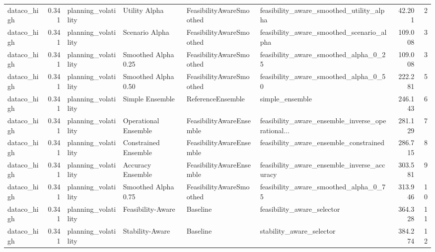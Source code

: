 \begin{table}
{\begin{tabular}{lrllllrr}
   dataco\_high &             0.341 &         planning\_volatility &         Utility Alpha &  FeasibilityAwareSmoothed &           feasibility\_aware\_smoothed\_utility\_alpha &        42.201 &               2 \\
   dataco\_high &             0.341 &         planning\_volatility &        Scenario Alpha &  FeasibilityAwareSmoothed &          feasibility\_aware\_smoothed\_scenario\_alpha &       109.008 &               3 \\
   dataco\_high &             0.341 &         planning\_volatility &   Smoothed Alpha 0.25 &  FeasibilityAwareSmoothed &              feasibility\_aware\_smoothed\_alpha\_0\_25 &       109.008 &               3 \\
   dataco\_high &             0.341 &         planning\_volatility &   Smoothed Alpha 0.50 &  FeasibilityAwareSmoothed &              feasibility\_aware\_smoothed\_alpha\_0\_50 &       222.281 &               5 \\
   dataco\_high &             0.341 &         planning\_volatility &       Simple Ensemble &         ReferenceEnsemble &                                    simple\_ensemble &       246.143 &               6 \\
   dataco\_high &             0.341 &         planning\_volatility &  Operational Ensemble &  FeasibilityAwareEnsemble &  feasibility\_aware\_ensemble\_inverse\_operational... &       281.129 &               7 \\
   dataco\_high &             0.341 &         planning\_volatility &  Constrained Ensemble &  FeasibilityAwareEnsemble &             feasibility\_aware\_ensemble\_constrained &       286.715 &               8 \\
   dataco\_high &             0.341 &         planning\_volatility &     Accuracy Ensemble &  FeasibilityAwareEnsemble &        feasibility\_aware\_ensemble\_inverse\_accuracy &       303.581 &               9 \\
   dataco\_high &             0.341 &         planning\_volatility &   Smoothed Alpha 0.75 &  FeasibilityAwareSmoothed &              feasibility\_aware\_smoothed\_alpha\_0\_75 &       313.946 &              10 \\
   dataco\_high &             0.341 &         planning\_volatility &     Feasibility-Aware &                  Baseline &                         feasibility\_aware\_selector &       364.328 &              11 \\
   dataco\_high &             0.341 &         planning\_volatility &       Stability-Aware &                  Baseline &                           stability\_aware\_selector &       384.274 &              12 \\

\end{tabular}}
\end{table}
